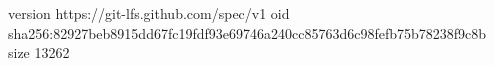 version https://git-lfs.github.com/spec/v1
oid sha256:82927beb8915dd67fc19fdf93e69746a240cc85763d6c98fefb75b78238f9c8b
size 13262
